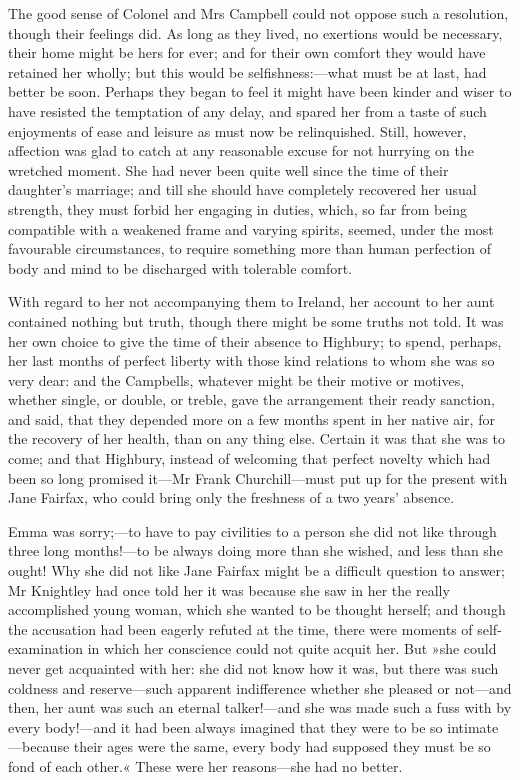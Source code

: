 The good sense of Colonel and Mrs Campbell could not oppose such a resolution, though their feelings did. As long as they lived, no exertions would be necessary, their home might be hers for ever; and for their own comfort they would have retained her wholly; but this would be selfishness:—what must be at last, had better be soon. Perhaps they began to feel it might have been kinder and wiser to have resisted the temptation of any delay, and spared her from a taste of such enjoyments of ease and leisure as must now be relinquished. Still, however, affection was glad to catch at any reasonable excuse for not hurrying on the wretched moment. She had never been quite well since the time of their daughter's marriage; and till she should have completely recovered her usual strength, they must forbid her engaging in duties, which, so far from being compatible with a weakened frame and varying spirits, seemed, under the most favourable circumstances, to require something more than human perfection of body and mind to be discharged with tolerable comfort.

With regard to her not accompanying them to Ireland, her account to her aunt contained nothing but truth, though there might be some truths not told. It was her own choice to give the time of their absence to Highbury; to spend, perhaps, her last months of perfect liberty with those kind relations to whom she was so very dear: and the Campbells, whatever might be their motive or motives, whether single, or double, or treble, gave the arrangement their ready sanction, and said, that they depended more on a few months spent in her native air, for the recovery of her health, than on any thing else. Certain it was that she was to come; and that Highbury, instead of welcoming that perfect novelty which had been so long promised it—Mr Frank Churchill—must put up for the present with Jane Fairfax, who could bring only the freshness of a two years' absence.

Emma was sorry;—to have to pay civilities to a person she did not like through three long months!—to be always doing more than she wished, and less than she ought! Why she did not like Jane Fairfax might be a difficult question to answer; Mr Knightley had once told her it was because she saw in her the really accomplished young woman, which she wanted to be thought herself; and though the accusation had been eagerly refuted at the time, there were moments of self-examination in which her conscience could not quite acquit her. But »she could never get acquainted with her: she did not know how it was, but there was such coldness and reserve—such apparent indifference whether she pleased or not—and then, her aunt was such an eternal talker!—and she was made such a fuss with by every body!—and it had been always imagined that they were to be so intimate—because their ages were the same, every body had supposed they must be so fond of each other.« These were her reasons—she had no better.

